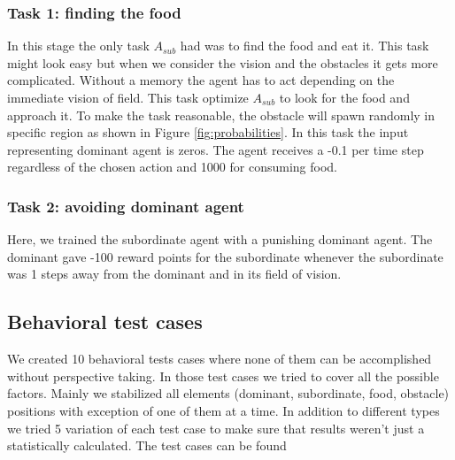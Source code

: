 \documentclass{article}
\begin{document}
\subsubsection{Task 1: finding the food} \label{task1}
In this stage the only task \(A_{sub}\) had was to find the food and eat it. This task might look easy but when we consider the vision and the obstacles it gets more complicated. Without a memory the agent has to act depending on the immediate vision of field. This task optimize \(A_{sub}\) to look for the food and approach it. To make the task reasonable, the obstacle will spawn randomly in specific region as shown in Figure \ref{fig:probabilities}. In this task the input representing dominant agent is zeros. The agent receives a -0.1 per time step regardless of the chosen action and 1000 for consuming food.
\subsubsection{Task 2: avoiding dominant agent}\label{task2}
Here, we trained the subordinate agent with a punishing dominant agent. The dominant gave -100 reward points for the subordinate whenever the subordinate was 1 steps away from the dominant and in its field of vision. 
 
\subsection{Behavioral test cases}\label{agents.behavior}
We created 10 behavioral tests cases where none of them can be accomplished without perspective taking. In those test cases we tried to cover all the possible factors. Mainly we stabilized all elements (dominant, subordinate, food, obstacle) positions with exception of one of them at a time.
In addition to different types we tried 5 variation of each test case to make sure that results weren't just a statistically calculated. The test cases can be found 
\end{document}
